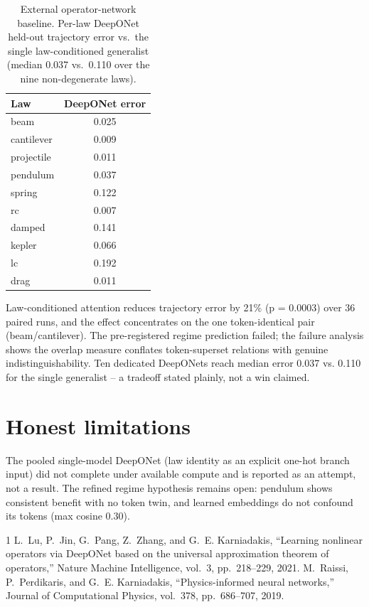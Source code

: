 \documentclass[conference,10pt]{IEEEtran}
\begin{document}
\begin{table}[!t]
\caption{External operator-network baseline. Per-law DeepONet held-out
trajectory error vs.\ the single law-conditioned generalist
(median 0.037 vs.\ 0.110 over the nine non-degenerate laws).}
\label{tab:deeponet}
\centering
\begin{tabular}{lc}
\toprule
Law & DeepONet error \\
\midrule
beam & 0.025 \\
cantilever & 0.009 \\
projectile & 0.011 \\
pendulum & 0.037 \\
spring & 0.122 \\
rc & 0.007 \\
damped & 0.141 \\
kepler & 0.066 \\
lc & 0.192 \\
drag & 0.011 \\
\bottomrule
\end{tabular}
\end{table}

Law-conditioned attention reduces trajectory error by 21\% (p = 0.0003) over 36 paired runs, and the effect concentrates on the one token-identical pair (beam/cantilever). The pre-registered regime prediction failed; the failure analysis shows the overlap measure conflates token-superset relations with genuine indistinguishability. Ten dedicated DeepONets reach median error 0.037 vs. 0.110 for the single generalist -- a tradeoff stated plainly, not a win claimed.

\section{Honest limitations}
The pooled single-model DeepONet (law identity as an explicit one-hot branch input) did not complete under available compute and is reported as an attempt, not a result. The refined regime hypothesis remains open: pendulum shows consistent benefit with no token twin, and learned embeddings do not confound its tokens (max cosine 0.30).

\begin{thebibliography}{1}
 L.~Lu, P.~Jin, G.~Pang, Z.~Zhang, and G.~E. Karniadakis, ``Learning nonlinear operators via DeepONet based on the universal approximation theorem of operators,'' Nature Machine Intelligence, vol.~3, pp.~218--229, 2021.
 M.~Raissi, P.~Perdikaris, and G.~E. Karniadakis, ``Physics-informed neural networks,'' Journal of Computational Physics, vol.~378, pp.~686--707, 2019.
\end{thebibliography}
\end{document}
